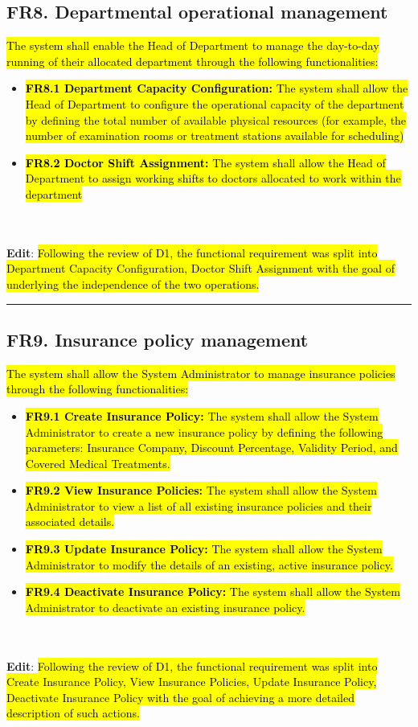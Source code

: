 \documentclass[12pt, a4paper]{article}
\begin{document}
\subsection{FR8. Departmental operational management} \label{FR8}
\hl{The system shall enable the Head of Department to manage the day-to-day running of their allocated department through the following functionalities:}
\begin{itemize}
    \item \hl{\textbf{FR8.1 Department Capacity Configuration:} The system shall allow the Head of Department to configure the operational capacity of the department by defining the total number of available physical resources (for example, the number of examination rooms or treatment stations available for scheduling)}
    \item \hl{\textbf{FR8.2 Doctor Shift Assignment:} The system shall allow the Head of Department to assign working shifts to doctors allocated to work within the department}
\end{itemize}
\\
\\ \textbf{Edit}:
\hl{Following the review of D1, the functional requirement was split into Department Capacity Configuration, Doctor Shift Assignment with the goal of underlying the independence of the two operations.}

\noindent\rule{\textwidth}{0.4pt}
\medskip
\subsection{FR9. Insurance policy management} \label{FR9}
\hl{The system shall allow the System Administrator to manage insurance policies through the following functionalities:}
\begin{itemize}
    \item \hl{\textbf{FR9.1 Create Insurance Policy:} The system shall allow the System Administrator to create a new insurance policy by defining the following parameters: Insurance Company, Discount Percentage, Validity Period, and Covered Medical Treatments.}
    \item \hl{\textbf{FR9.2 View Insurance Policies:} The system shall allow the System Administrator to view a list of all existing insurance policies and their associated details.}
    \item \hl{\textbf{FR9.3 Update Insurance Policy:} The system shall allow the System Administrator to modify the details of an existing, active insurance policy.}
    \item \hl{\textbf{FR9.4 Deactivate Insurance Policy:} The system shall allow the System Administrator to deactivate an existing insurance policy.}
\end{itemize}
\\
\\ \textbf{Edit}:
\hl{Following the review of D1, the functional requirement was split into Create Insurance Policy, View Insurance Policies, Update Insurance Policy, Deactivate Insurance Policy with the goal of achieving a more detailed description of such actions.}
\end{document}
